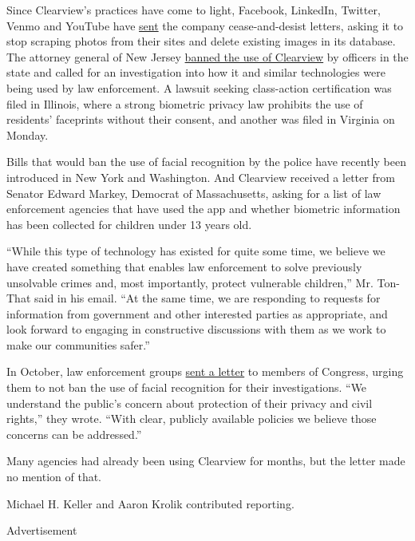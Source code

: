 Since Clearview's practices have come to light, Facebook, LinkedIn,
Twitter, Venmo and YouTube have
\href{https://www.nytimes3xbfgragh.onion/2020/01/22/technology/clearview-ai-twitter-letter.html}{sent}
the company cease-and-desist letters, asking it to stop scraping photos
from their sites and delete existing images in its database. The
attorney general of New Jersey
\href{https://www.nytimes3xbfgragh.onion/2020/01/24/technology/clearview-ai-new-jersey.html}{banned
the use of Clearview} by officers in the state and called for an
investigation into how it and similar technologies were being used by
law enforcement. A lawsuit seeking class-action certification was filed
in Illinois, where a strong biometric privacy law prohibits the use of
residents' faceprints without their consent, and another was filed in
Virginia on Monday.

Bills that would ban the use of facial recognition by the police have
recently been introduced in New York and Washington. And Clearview
received a letter from Senator Edward Markey, Democrat of Massachusetts,
asking for a list of law enforcement agencies that have used the app and
whether biometric information has been collected for children under 13
years old.

``While this type of technology has existed for quite some time, we
believe we have created something that enables law enforcement to solve
previously unsolvable crimes and, most importantly, protect vulnerable
children,'' Mr. Ton-That said in his email. ``At the same time, we are
responding to requests for information from government and other
interested parties as appropriate, and look forward to engaging in
constructive discussions with them as we work to make our communities
safer.''

In October, law enforcement groups
\href{https://www.ascia.org/pdf/news/le_group_letter_to_congress__facial_recogniton_technology__october_2019.pdf}{sent
a letter} to members of Congress, urging them to not ban the use of
facial recognition for their investigations. ``We understand the
public's concern about protection of their privacy and civil rights,''
they wrote. ``With clear, publicly available policies we believe those
concerns can be addressed.''

Many agencies had already been using Clearview for months, but the
letter made no mention of that.

Michael H. Keller and Aaron Krolik contributed reporting.

Advertisement

